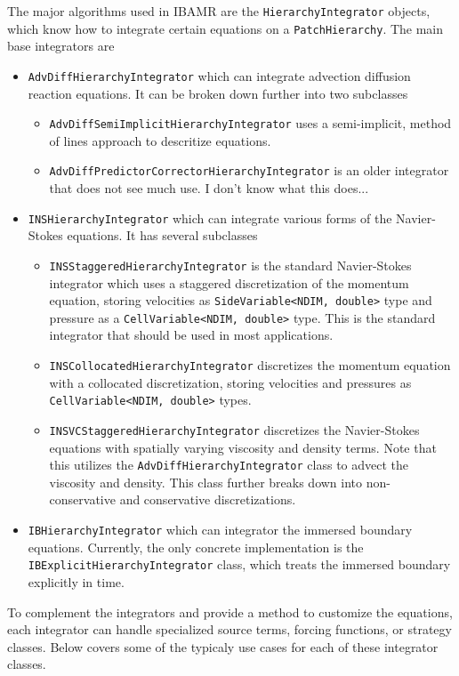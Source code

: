\documentclass{article}
\begin{document}
The major algorithms used in IBAMR are the \verb|HierarchyIntegrator| objects, which know how to integrate certain equations on a \verb|PatchHierarchy|. The main base integrators are
\begin{itemize}
\item \verb|AdvDiffHierarchyIntegrator| which can integrate advection diffusion reaction equations. It can be broken down further into two subclasses
\begin{itemize}
  \item \verb|AdvDiffSemiImplicitHierarchyIntegrator| uses a semi-implicit, method of lines approach to descritize equations.
  \item \verb|AdvDiffPredictorCorrectorHierarchyIntegrator| is an older integrator that does not see much use. I don't know what this does...
\end{itemize}
\item \verb|INSHierarchyIntegrator| which can integrate various forms of the Navier-Stokes equations. It has several subclasses
  \begin{itemize}
    \item \verb|INSStaggeredHierarchyIntegrator| is the standard Navier-Stokes integrator which uses a staggered discretization of the momentum equation, storing velocities as \verb|SideVariable<NDIM, double>| type and pressure as a \verb|CellVariable<NDIM, double>| type. This is the standard integrator that should be used in most applications.
    \item \verb|INSCollocatedHierarchyIntegrator| discretizes the momentum equation with a collocated discretization, storing velocities and pressures as \verb|CellVariable<NDIM, double>| types.
    \item \verb|INSVCStaggeredHierarchyIntegrator| discretizes the Navier-Stokes equations with spatially varying viscosity and density terms. Note that this utilizes the \verb|AdvDiffHierarchyIntegrator| class to advect the viscosity and density. This class further breaks down into non-conservative and conservative discretizations.
  \end{itemize}
\item \verb|IBHierarchyIntegrator| which can integrator the immersed boundary equations. Currently, the only concrete implementation is the \verb|IBExplicitHierarchyIntegrator| class, which treats the immersed boundary explicitly in time.
\end{itemize}

To complement the integrators and provide a method to customize the equations, each integrator can handle specialized source terms, forcing functions, or strategy classes. Below covers some of the typicaly use cases for each of these integrator classes.
\end{document}
